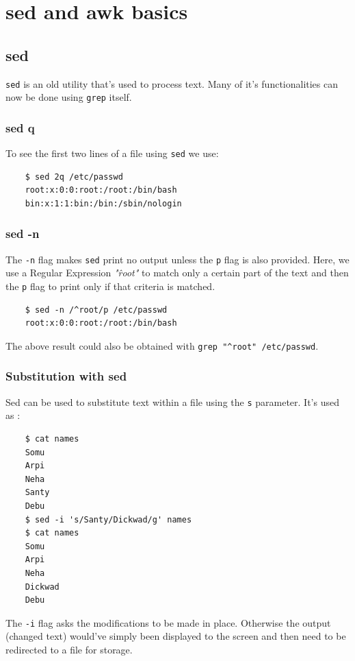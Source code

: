 \documentclass{report}
\begin{document}
	\section{sed and awk basics}
	\subsection{sed}
	\verb|sed| is an old utility that's used to process text. Many of it's functionalities can now be done using \verb|grep| itself. 
	
	\subsubsection{sed q}
	To see the first two lines of a file using \verb|sed| we use:
	
	\begin{verbatim}
	$ sed 2q /etc/passwd
	root:x:0:0:root:/root:/bin/bash
	bin:x:1:1:bin:/bin:/sbin/nologin
	\end{verbatim}
	
	\subsubsection{sed -n}
	The \verb|-n| flag makes \verb|sed| print no output unless the \verb|p| flag is also provided. Here, we use a Regular Expression \textit{"\^root"} to match only a certain part of the text and then the \verb|p| flag to print only if that criteria is matched. 
	
	\begin{verbatim}
	$ sed -n /^root/p /etc/passwd
	root:x:0:0:root:/root:/bin/bash
	\end{verbatim}
	
	The above result could also be obtained with \verb|grep "^root" /etc/passwd|.
	
	\subsubsection{Substitution with sed}
	Sed can be used to substitute text within a file using the \verb|s| parameter. It's used as :
	
	\begin{verbatim}
	$ cat names
	Somu
	Arpi
	Neha
	Santy
	Debu
	$ sed -i 's/Santy/Dickwad/g' names
	$ cat names
	Somu
	Arpi
	Neha
	Dickwad
	Debu
	\end{verbatim}
	
	The \verb|-i| flag asks the modifications to be made in place. Otherwise the output (changed text) would've simply been displayed to the screen and then need to be redirected to a file for storage.
	
\end{document}
